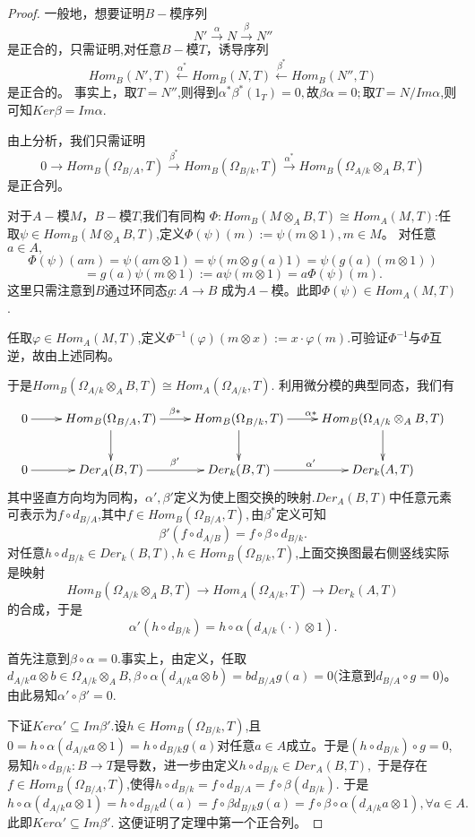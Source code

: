 \documentclass[UTF8]{article}
\begin{document}
\begin{proof}
	一般地，想要证明$B-$模序列
	$$
	N'\stackrel{\alpha}{\rightarrow}N\stackrel{\beta}{\rightarrow}N''
	$$
	是正合的，只需证明,对任意$B-$模$T$，诱导序列
	$$
		Hom_{B}(N',T)\stackrel{\alpha^*}{\leftarrow}Hom_{B}(N,T)\stackrel{\beta^*}{\leftarrow}Hom_{B}(N'',T)
	$$
	是正合的。
	事实上，取$T=N''$,则得到$\alpha^{*}\beta^{*}(1_{T})=0,$故$\beta\alpha=0;$取$T=N/Im\alpha$,则可知$Ker\beta =Im\alpha$.
	
	由上分析，我们只需证明
	$$
	0\rightarrow Hom_{B}(\Omega_{B/A},T)\stackrel{\beta^*}{\rightarrow}Hom_{B}(\Omega_{B/k},T)\stackrel{\alpha^*}{\rightarrow}Hom_{B}(\Omega_{A/k}\otimes_{A}B,T)
	$$
	是正合列。
	
	对于$A-$模$M$，$B-$模$T$,我们有同构
	$\Phi:Hom_{B}(M\otimes_{A}B,T)\cong Hom_{A}(M,T)$:任取$\psi\in Hom_{B}(M\otimes_{A}B,T)$,定义$\Phi(\psi)(m):=\psi(m\otimes 1),m\in M$。
	对任意$a\in A,$
	$$\Phi(\psi)(am)=\psi(am\otimes 1)=\psi(m\otimes g(a)1)
	=\psi(g(a)(m\otimes 1))
	$$
	$$=g(a)\psi(m\otimes 1):=a\psi(m\otimes 1)=a\Phi(\psi)(m).$$
	这里只需注意到$B$通过环同态$g:A\rightarrow B$
	成为$A-$模。此即$\Phi(\psi)\in Hom_{A}(M,T)$.
	
	任取$\varphi\in Hom_{A}(M,T)$,定义$\Phi^{-1}(\varphi)(m\otimes x):=x\cdot \varphi(m).$可验证$\Phi^{-1}$与$\Phi$互逆，故由上述同构。
	
	于是$Hom_{B}(\Omega_{A/k}\otimes_{A}B,T)\cong Hom_{A}(\Omega_{A/k},T).$
	利用微分模的典型同态，我们有
	$$
	\xymatrix{
	0\ar[r]&Hom_{B}(\Omega_{B/A},T)\ar[r]^{\beta*}\ar[d]&Hom_{B}(\Omega_{B/k},T)\ar[r]^{\alpha*}\ar[d]&Hom_{B}(\Omega_{A/k}\otimes_{A}B,T)\ar[d]\\
0\ar[r]&Der_{A}(B,T)\ar[r]^{\beta'}&Der_{k}(B,T)\ar[r]^{\alpha'}&Der_{k}(A,T)
}$$
其中竖直方向均为同构，$\alpha',\beta'$定义为使上图交换的映射.$Der_{A}(B,T)$中任意元素可表示为$f\circ d_{B/A}$,其中$f\in Hom_{B}(\Omega_{B/A},T),$由$\beta^*$定义可知
$$\beta'(f\circ d_{A/B})=f\circ \beta \circ d_{B/k}.$$
	对任意$h\circ d_{B/k}\in Der_{k}(B,T),h\in Hom_{B}(\Omega_{B/k},T)$,上面交换图最右侧竖线实际是映射
	$$Hom_{B}(\Omega_{A/k}\otimes_{A}B,T)\rightarrow Hom_{A}(\Omega_{A/k},T)\rightarrow Der_{k}(A,T)$$
	的合成，于是
	$$\alpha'(h\circ d_{B/k})=h\circ \alpha (d_{A/k}(\cdot)\otimes 1).$$
	
首先注意到$\beta\circ \alpha=0.$事实上，由定义，任取$d_{A/k}a\otimes b \in \Omega_{A/k}\otimes_{A}B,\beta\circ\alpha (d_{A/k}a\otimes b)=bd_{B/A}g(a)=0$(注意到$d_{B/A}\circ g=0$)。由此易知$\alpha'\circ \beta'=0.$


下证$
 Ker\alpha'\subseteq Im\beta'.
$设$h\in Hom_{B}(\Omega_{B/k},T)$,且$0=h\circ \alpha(d_{A/k}a\otimes 1)=h\circ d_{B/k}g(a)$对任意$a\in A$成立。于是$(h\circ d_{B/k})\circ g=0$,
易知$h\circ d_{B/k}:B\rightarrow T$是导数，进一步由定义$h\circ d_{B/k}\in Der_{A}(B,T),$
于是存在$f\in Hom_{B}(\Omega_{B/A},T)$,使得$h\circ d_{B/k}=f\circ d_{B/A}=f\circ \beta(d_{B/k})$.
于是
$$
h\circ \alpha(d_{A/k}a\otimes 1)=h\circ d_{B/k}d(a)=f\circ \beta d_{B/k}g(a)=f\circ \beta \circ \alpha(d_{A/k}a\otimes 1),\forall a\in A.
$$
此即$Ker\alpha'\subseteq Im\beta'$.
这便证明了定理中第一个正合列。


\end{proof}
\end{document}
